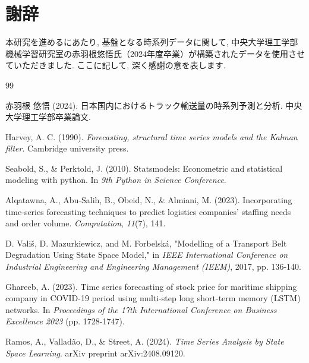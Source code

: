 \documentclass[a4paper, 10pt]{jarticle}
\begin{document}
\section*{謝辞}
本研究を進めるにあたり, 基盤となる時系列データに関して, 
中央大学理工学部 機械学習研究室の赤羽根悠悟氏（2024年度卒業）が構築されたデータを使用させていただきました. ここに記して, 深く感謝の意を表します. 

\begin{thebibliography}{99}
  \setlength{\itemsep}{0pt}

赤羽根 悠悟 (2024). 日本国内におけるトラック輸送量の時系列予測と分析. 中央大学理工学部卒業論文.

Harvey, A. C. (1990). \textit{Forecasting, structural time series models and the Kalman filter}. Cambridge university press.

Seabold, S., \& Perktold, J. (2010). Statsmodels: Econometric and statistical modeling with python. 
In \textit{9th Python in Science Conference}.

Alqatawna, A., Abu-Salih, B., Obeid, N., \& Almiani, M. (2023). 
Incorporating time-series forecasting techniques to predict logistics companies' staffing needs and order volume. 
\textit{Computation}, \textit{11}(7), 141.

D. Vališ, D. Mazurkiewicz, and M. Forbelská, 
"Modelling of a Transport Belt Degradation Using State Space Model,"
in \textit{IEEE International Conference on Industrial Engineering and Engineering Management (IEEM)}, 2017, pp. 136-140.

Ghareeb, A. (2023).
Time series forecasting of stock price for maritime shipping company in COVID-19 period using multi-step long short-term memory (LSTM) networks.
In \textit{Proceedings of the 17th International Conference on Business Excellence 2023} (pp. 1728-1747).

Ramos, A., Valladão, D., \& Street, A. (2024). 
\textit{Time Series Analysis by State Space Learning}. 
arXiv preprint arXiv:2408.09120.

\end{thebibliography}
\end{document}
